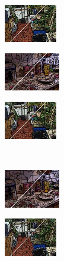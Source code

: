 \begin{figure}
\begin{subfigure}[b]{0.1375\textwidth}
	\end{subfigure}
	\begin{subfigure}[b]{0.129\textwidth}
		\includegraphics[height=1.65cm]{pictures/sunrgbd/slic/cropped/slic_00004732_contours}
	\end{subfigure}
	\begin{subfigure}[b]{0.02\textwidth}
	\end{subfigure}
	\begin{subfigure}[b]{0.1375\textwidth}
		\includegraphics[height=1.65cm]{pictures/nyuv2/crs/cropped/crs_00000561_contours}
	\end{subfigure}
	\begin{subfigure}[b]{0.129\textwidth}
		\includegraphics[height=1.65cm]{pictures/sunrgbd/crs/cropped/crs_00004732_contours}
	\end{subfigure}\\
	\begin{subfigure}[b]{0.02\textwidth}
	\end{subfigure}
	\begin{subfigure}[b]{0.1375\textwidth}
		\includegraphics[height=1.65cm]{pictures/nyuv2/ers/cropped/ers_00000561_contours}
	\end{subfigure}
	\begin{subfigure}[b]{0.129\textwidth}
		\includegraphics[height=1.65cm]{pictures/sunrgbd/ers/cropped/ers_00004732_contours}

\end{subfigure}
\end{figure}

